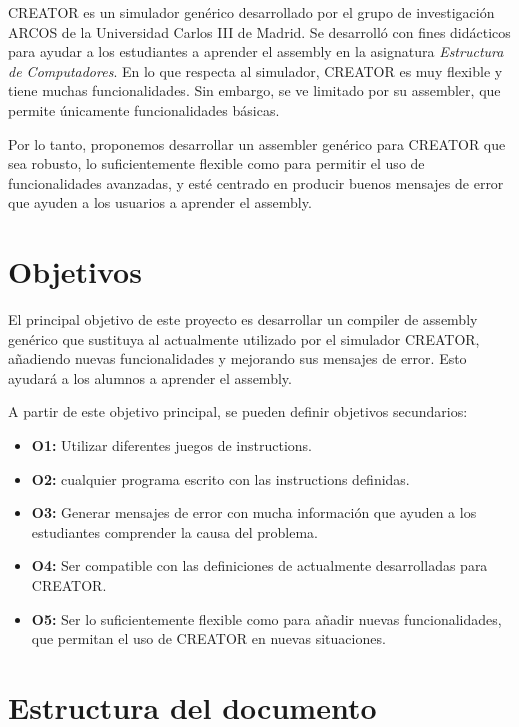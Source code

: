 CREATOR \parencite{CREATOR} es un simulador genérico desarrollado por el grupo
de investigación ARCOS de la Universidad Carlos III de Madrid. Se desarrolló con
fines didácticos para ayudar a los estudiantes a aprender el \gls{assembly} en
la asignatura \textit{Estructura de Computadores}. En lo que respecta al
simulador, CREATOR es muy flexible y tiene muchas funcionalidades. Sin embargo,
se ve limitado por su \gls{assembler}, que permite únicamente funcionalidades
básicas.

Por lo tanto, proponemos desarrollar un \gls{assembler} genérico para CREATOR
que sea robusto, lo suficientemente flexible como para permitir el uso de
funcionalidades avanzadas, y esté centrado en producir buenos mensajes de error
que ayuden a los usuarios a aprender el \gls{assembly}.

\section{Objetivos}\label{sec:objectives}

El principal objetivo de este proyecto es desarrollar un \gls{compiler} de
\gls{assembly}  genérico que sustituya al actualmente utilizado por el simulador
CREATOR, añadiendo nuevas funcionalidades y mejorando sus mensajes de error.
Esto ayudará a los alumnos a aprender el \gls{assembly}.

\noindent
A partir de este objetivo principal, se pueden definir objetivos secundarios:

\begin{itemize}
    \item \textbf{O1:} Utilizar diferentes juegos de \glspl{instruction}.
    \item \textbf{O2:}  cualquier programa
     escrito con las \glspl{instruction}
    definidas.
    \item \textbf{O3:} Generar mensajes de error con mucha información que
    ayuden a los estudiantes comprender la causa del problema.
    \item \textbf{O4:} Ser compatible con las definiciones de
     actualmente desarrolladas para CREATOR.
    \item \textbf{O5:} Ser lo suficientemente flexible como para añadir nuevas
    funcionalidades, que permitan el uso de CREATOR en nuevas situaciones.
\end{itemize}

\section{Estructura del documento}\label{sec:structure}

